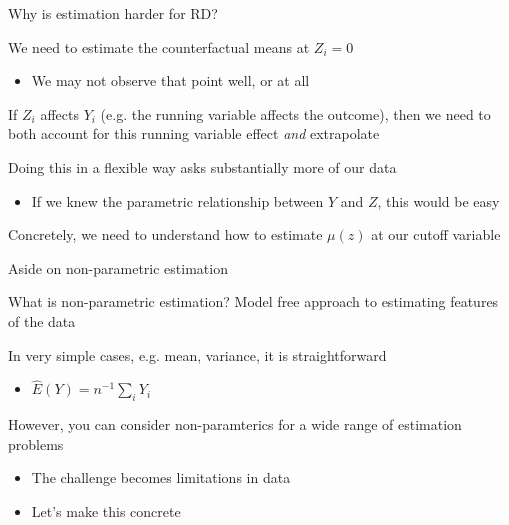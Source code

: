 \documentclass[notes,11pt, aspectratio=169]{beamer}
\newenvironment{wideitemize}{\itemize\addtolength{\itemsep}{10pt}}{\enditemize}
\begin{document}
\begin{frame}{Why is estimation harder for RD?}
  \begin{wideitemize}
    \item We need to estimate the counterfactual means at $Z_{i} = 0$
    \begin{itemize}
    \item We may not observe that point well, or at all
    \end{itemize}
  \item If $Z_{i}$ affects $Y_{i}$ (e.g. the running variable affects
    the outcome), then we need to both account for this running
    variable effect \emph{and} extrapolate
  \item Doing this in a flexible way asks substantially more of our data
    \begin{itemize}
    \item If we knew the parametric relationship between $Y$ and $Z$,
      this would be easy
    \end{itemize}
  \item Concretely, we need to understand how to estimate
    $\mu(z)$ at our cutoff variable
  \end{wideitemize}
\end{frame}

\begin{frame}{Aside on non-parametric estimation}
  \begin{wideitemize}
  \item What is non-parametric estimation? Model free approach to estimating features of the data
  \item In very simple cases, e.g. mean, variance, it is straightforward
    \begin{itemize}
    \item $\hat{E}(Y) = n^{-1}\sum_{i} Y_{i}$
    \end{itemize}
  \item However, you can consider non-paramterics for a wide range of estimation problems
    \begin{itemize}
    \item The challenge becomes limitations in data
    \item Let's make this concrete
    \end{itemize}
  \end{wideitemize}
\end{frame}
\end{document}
